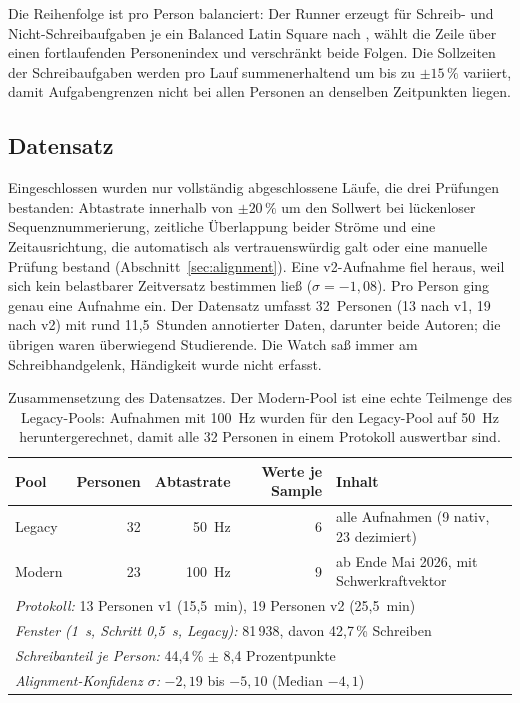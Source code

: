 Die Reihenfolge ist pro Person balanciert: Der Runner erzeugt für Schreib-
und Nicht-Schreibaufgaben je ein Balanced Latin Square nach
\citet{williams1949}, wählt die Zeile über einen fortlaufenden Personenindex
und verschränkt beide Folgen. Die Sollzeiten der Schreibaufgaben werden pro
Lauf summenerhaltend um bis zu $\pm 15\,\%$ variiert, damit Aufgabengrenzen
nicht bei allen Personen an denselben Zeitpunkten liegen.

\subsection{Datensatz}
\label{sec:dataset}

Eingeschlossen wurden nur vollständig abgeschlossene Läufe, die drei Prüfungen
bestanden: Abtastrate innerhalb von $\pm 20\,\%$ um den Sollwert bei
lückenloser Sequenznummerierung, zeitliche Überlappung beider Ströme und eine
Zeitausrichtung, die automatisch als vertrauenswürdig galt oder eine manuelle
Prüfung bestand (Abschnitt~\ref{sec:alignment}). Eine v2-Aufnahme fiel
heraus, weil sich kein belastbarer Zeitversatz bestimmen ließ
($\sigma = -1{,}08$). Pro Person ging genau eine Aufnahme ein. Der Datensatz
umfasst 32~Personen (13 nach v1, 19 nach v2) mit rund 11,5~Stunden
annotierter Daten, darunter beide Autoren; die übrigen waren überwiegend
Studierende. Die Watch saß immer am Schreibhandgelenk, Händigkeit wurde nicht
erfasst.

\begin{table}[H]
  \centering
  \caption{Zusammensetzung des Datensatzes. Der Modern-Pool ist eine echte
  Teilmenge des Legacy-Pools: Aufnahmen mit 100~Hz wurden für den Legacy-Pool
  auf 50~Hz heruntergerechnet, damit alle 32 Personen in einem Protokoll
  auswertbar sind.}
  \label{tab:cohort}
  \small
  \begin{tabular}{lrrrl}
    \hline
    \textbf{Pool} & \textbf{Personen} & \textbf{Abtastrate} & \textbf{Werte je Sample} & \textbf{Inhalt} \\ \hline \hline
    Legacy & 32 & 50~Hz & 6 & alle Aufnahmen (9 nativ, 23 dezimiert) \\
    Modern & 23 & 100~Hz & 9 & ab Ende Mai 2026, mit Schwerkraftvektor \\ \hline
    \multicolumn{5}{l}{\textit{Protokoll:} 13 Personen v1 (15,5~min), 19 Personen v2 (25,5~min)} \\
    \multicolumn{5}{l}{\textit{Fenster (1~s, Schritt 0,5~s, Legacy):} 81\,938, davon 42,7\,\% Schreiben} \\
    \multicolumn{5}{l}{\textit{Schreibanteil je Person:} 44,4\,\% $\pm$ 8,4 Prozentpunkte} \\
    \multicolumn{5}{l}{\textit{Alignment-Konfidenz $\sigma$:} $-2{,}19$ bis $-5{,}10$ (Median $-4{,}1$)} \\ \hline
  \end{tabular}
\end{table}

